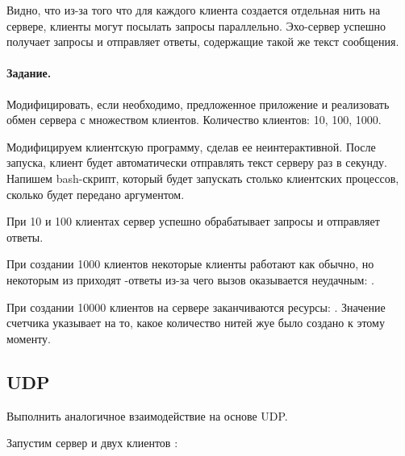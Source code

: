 


Видно, что из-за того что для каждого клиента создается отдельная нить на сервере, клиенты могут посылать запросы параллельно. Эхо-сервер успешно получает запросы и отправляет ответы, содержащие такой же текст сообщения.

\paragraph{Задание.} Модифицировать, если необходимо, предложенное приложение и реализовать обмен сервера с множеством клиентов. Количество клиентов: 10, 100, 1000.

Модифицируем клиентскую программу, сделав ее неинтерактивной. После запуска, клиент будет автоматически отправлять текст серверу раз в секунду. Напишем bash-скрипт, который будет запускать столько клиентских процессов, сколько будет передано аргументом.




При 10 и 100 клиентах сервер успешно обрабатывает запросы и отправляет ответы. 

При создании 1000 клиентов некоторые клиенты работают как обычно, но некоторым из приходят -ответы из-за чего вызов  оказывается неудачным: . 

При создании 10000 клиентов на сервере заканчиваются ресурсы: . Значение счетчика указывает на то, какое количество нитей жуе было создано к этому моменту.

\subsection{UDP}

Выполнить аналогичное взаимодействие на основе UDP.



Запустим сервер  и двух клиентов :


